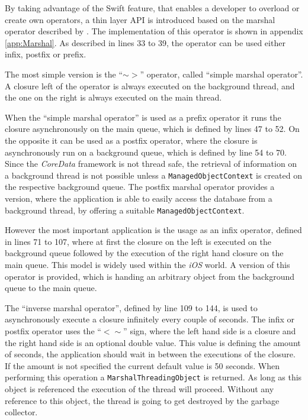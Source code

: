 By taking advantage of the \gls{Swift} feature, that enables a developer to overload or create own operators, a thin layer \gls{API} is introduced based on the marshal operator described by \cite{Smith:2014aa}. The implementation of this operator is shown in appendix \vref{app:Marshal}. As described in lines 33 to 39, the operator can be used either infix, postfix or prefix.

The most simple version is the \enquote{$\sim>$} operator, called \enquote{simple marshal operator}. A closure left of the operator is always executed on the background thread, and the one on the right is always executed on the main thread. 

When the \enquote{simple marshal operator} is used as a prefix operator it runs the closure asynchronously on the main queue, which is defined by lines 47 to 52. On the opposite it can  be used as a postfix operator, where the closure is asynchronously run on a background queue, which is defined by line 54 to 70. Since the \emph{CoreData} framework is not thread safe, the retrieval of information on a background thread is not possible unless a \texttt{ManagedObjectContext} is created on the respective background queue. The postfix marshal operator provides a version, where the application is able to easily access the database from a background thread, by offering a suitable \texttt{ManagedObjectContext}.

However the most important application is the usage as an infix operator, defined in lines 71 to 107, where at first the closure on the left is executed on the background queue followed by the execution of the right hand closure on the main queue. This model is widely used within the \emph{iOS} world. A version of this operator is provided, which is handing an arbitrary object from the background queue to the main queue.

The \enquote{inverse marshal operator}, defined by line 109 to 144, is used to asynchronously execute a closure infinitely every couple of seconds. The infix or postfix operator uses the \enquote{$<\sim$} sign, where the left hand side is a closure and the right hand side is an optional double value. This value is defining the amount of seconds, the application should wait in between the executions of the closure. If the amount is not specified the current default value is 50 seconds. When performing this operation a \texttt{MarshalThreadingObject} is returned. As long as this object is referenced the execution of the thread will proceed. Without any reference to this object, the thread is going to get destroyed by the garbage collector.

